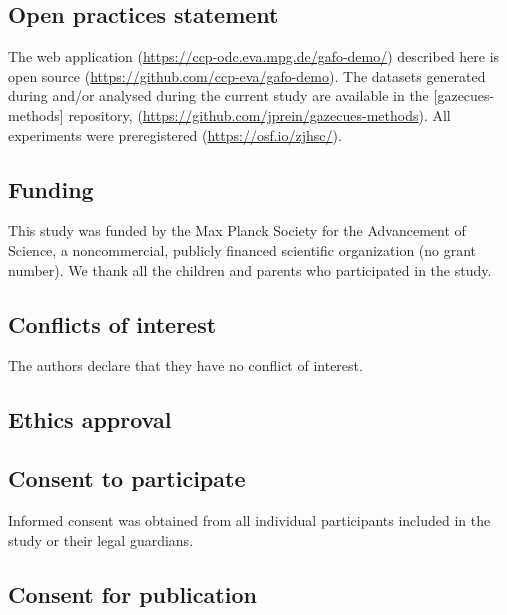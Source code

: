 \documentclass[
  man,floatsintext]{apa6}
\begin{document}
\hypertarget{open-practices-statement}{%
\subsection{Open practices statement}\label{open-practices-statement}}

The web application (\url{https://ccp-odc.eva.mpg.de/gafo-demo/}) described here is open source (\url{https://github.com/ccp-eva/gafo-demo}).
The datasets generated during and/or analysed during the current study are available in the {[}gazecues-methods{]} repository, (\url{https://github.com/jprein/gazecues-methods}). All experiments were preregistered (\url{https://osf.io/zjhsc/}).

\hypertarget{funding}{%
\subsection{Funding}\label{funding}}

This study was funded by the Max Planck Society for the Advancement of Science, a noncommercial, publicly financed scientific organization (no grant number). We thank all the children and parents who participated in the study.

\hypertarget{conflicts-of-interest}{%
\subsection{Conflicts of interest}\label{conflicts-of-interest}}

The authors declare that they have no conflict of interest.

\hypertarget{ethics-approval}{%
\subsection{Ethics approval}\label{ethics-approval}}

\hypertarget{consent-to-participate}{%
\subsection{Consent to participate}\label{consent-to-participate}}

Informed consent was obtained from all individual participants included in the study or their legal guardians.

\hypertarget{consent-for-publication}{%
\subsection{Consent for publication}\label{consent-for-publication}}
\end{document}
